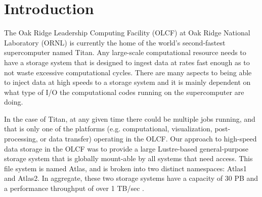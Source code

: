 \documentclass[conference,compsoc]{IEEEtran}
\begin{document}
%
\IEEEpeerreviewmaketitle


\section{Introduction}

The Oak Ridge Leadership Computing Facility (OLCF) at 
Oak Ridge National Laboratory (ORNL) is currently the home of the world's
second-fastest supercomputer named Titan. Any large-scale computational
resource needs to have a storage system that is designed to ingest data at
rates fast enough as to not waste excessive computational cycles. There are
many aspects to being able to inject data at high speeds to a storage system
and it is mainly dependent on what type of I/O the computational codes running
on the supercomputer are doing. 

In the case of Titan, at any given time there could be multiple jobs running,
and that is only one of the platforms (e.g. computational, visualization,
post-processing, or data transfer) operating in the OLCF. Our approach to
high-speed data storage in the OLCF was to provide a large Lustre-based
general-purpose storage system that is globally mount-able by all systems that
need access. This file system is named Atlas, and is broken into two distinct
namespaces: Atlas1 and Atlas2. In aggregate, these two storage systems have a
capacity of 30 PB and a performance throughput of over 1 TB/sec \cite{sarp-cug}. 
\end{document}
